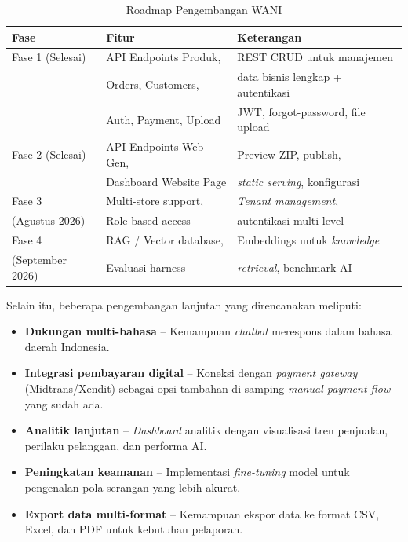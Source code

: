 \documentclass[12pt,a4paper,oneside]{article}
\begin{document}
\begin{table}[H]
	\centering
	\caption{Roadmap Pengembangan WANI}
	\label{tab:roadmap}
	\begin{tabularx}{\textwidth}{p{2.5cm}p{4cm}X}
		\toprule
		\textbf{Fase}       & \textbf{Fitur}          & \textbf{Keterangan}                    \\
		\midrule
		Fase 1 (Selesai)    & API Endpoints Produk,   & REST CRUD untuk manajemen              \\
		                    & Orders, Customers,      & data bisnis lengkap + autentikasi      \\
		                    & Auth, Payment, Upload   & JWT, forgot-password, file upload      \\
		\addlinespace
		Fase 2 (Selesai)    & API Endpoints Web-Gen,  & Preview ZIP, publish,                  \\
		                    & Dashboard Website Page  & \textit{static serving}, konfigurasi   \\
		\addlinespace
		Fase 3              & Multi-store support,    & \textit{Tenant management},            \\
		(Agustus 2026)      & Role-based access       & autentikasi multi-level                \\
		\addlinespace
		Fase 4              & RAG / Vector database,  & Embeddings untuk \textit{knowledge}    \\
		(September 2026)    & Evaluasi harness        & \textit{retrieval}, benchmark AI       \\
		\bottomrule
	\end{tabularx}
\end{table}

Selain itu, beberapa pengembangan lanjutan yang direncanakan meliputi:
\begin{itemize}
	\item \textbf{Dukungan multi-bahasa} -- Kemampuan \textit{chatbot} merespons dalam bahasa daerah Indonesia.
	\item \textbf{Integrasi pembayaran digital} -- Koneksi dengan \textit{payment gateway} (Midtrans/Xendit) sebagai opsi tambahan di samping \textit{manual payment flow} yang sudah ada.
	\item \textbf{Analitik lanjutan} -- \textit{Dashboard} analitik dengan visualisasi tren penjualan, perilaku pelanggan, dan performa AI.
	\item \textbf{Peningkatan keamanan} -- Implementasi \textit{fine-tuning} model untuk pengenalan pola serangan yang lebih akurat.
	\item \textbf{Export data multi-format} -- Kemampuan ekspor data ke format CSV, Excel, dan PDF untuk kebutuhan pelaporan.
\end{itemize}
\end{document}
